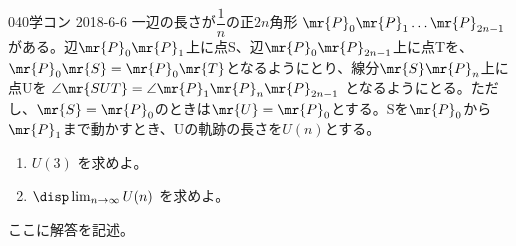 \begin{thm}{040}{}{学コン 2018-6-6}
 一辺の長さが$\dfrac{1}{n}$の正$2n$角形 $\mr{P}_0\mr{P}_1\dots \mr{P}_{2n-1}$ がある。辺$\mr{P}_0\mr{P}_1$上に点S、辺$\mr{P}_0\mr{P}_{2n-1}$上に点Tを、$\mr{P}_0\mr{S}=\mr{P}_0\mr{T}$となるようにとり、線分$\mr{S}\mr{P}_n$上に点Uを $\angle\mr{SUT}=\angle\mr{P}_1\mr{P}_n\mr{P}_{2n-1}$ となるようにとる。ただし、$\mr{S}=\mr{P}_0$のときは$\mr{U}=\mr{P}_0$とする。Sを$\mr{P}_0$から$\mr{P}_1$まで動かすとき、Uの軌跡の長さを$U(n)$とする。
 \begin{enumerate}
  \item $U(3)$ を求めよ。
  \item $\disp \lim_{n\to\infty} U(n)$ を求めよ。
 \end{enumerate}
\end{thm}

ここに解答を記述。